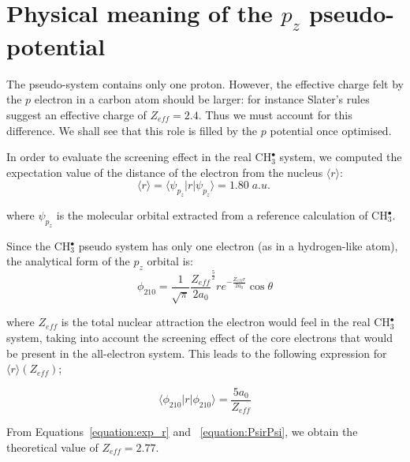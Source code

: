 \documentclass[12pt]{article}
\begin{document}
\section*{\sffamily \large Physical meaning of the \(p_{z}\) pseudo-potential} \label{minimalpotguess}

The pseudo-system contains only one proton. However, the effective charge felt by the $p$ electron in a carbon atom should be larger: for instance Slater's rules suggest an effective charge of $Z_{eff}=2.4$. Thus we must account for this difference. We shall see that this role is filled by the $p$ potential once optimised. 

In order to evaluate the screening effect in the real CH\(^{\bullet}_{3}\) system, we computed the expectation value of the distance of the electron from the nucleus \( \langle r \rangle \):
\begin{equation}
\langle r \rangle = \langle \psi_{p_{z}} | r | \psi_{p_{z}} \rangle = 1.80\;a.u.\
\label{equation:exp_r}
\end{equation}

where \(\psi_{p_{z}}\) is the molecular orbital extracted from a reference calculation of CH\(^{\bullet}_{3}\). 

Since the CH\(^{\bullet}_{3}\) pseudo system has only one electron (as in a hydrogen-like atom), 
the analytical form of the \(p_{z}\) orbital is:~\cite{me_structure_theory} 
\begin{equation}
\label{equation:analyticalpz}
\phi_{210} = \frac{1}{\sqrt{\pi}} \frac{Z_{eff}}{2a_{0}} ^{\frac{5}{2}} re^{-\frac{Z_{eff}r}{2a_{0}}} \cos \theta
\end{equation}

where \(Z_{eff}\) is the total nuclear attraction the electron 
would feel in the real CH\(^{\bullet}_{3}\) system, taking into account the screening effect of the core electrons that would be 
present in the all-electron system.
This leads to the following expression for \( \langle r \rangle (Z_{eff}) \); 

\begin{equation}
\label{equation:PsirPsi}
\langle \phi_{210} | r | \phi_{210} \rangle = \frac{5a_{0}}{Z_{eff}}
\end{equation}

From Equations~\ref{equation:exp_r} and ~\ref{equation:PsirPsi}, we obtain the theoretical value of \(Z_{eff} = 2.77\).
\end{document}
